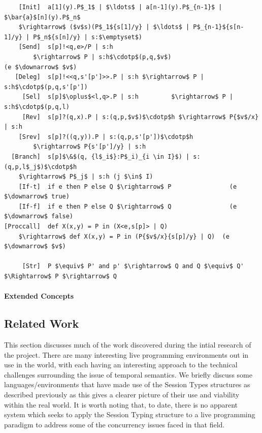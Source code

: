 \documentclass[11pt]{scrartcl}
\begin{document}
\begin{lstlisting}
    [Init]  a[1](y).P$_1$ | $\ldots$ | a[n-1](y).P$_{n-1}$ | $\bar{a}$[n](y).P$_n$ 
	$\rightarrow$ ($v$s)(P$_1${s[1]/y} | $\ldots$ | P$_{n-1}${s[n-1]/y} | P$_n${s[n]/y} | s:$\emptyset$)
    [Send]  s[p]!<q,e>/P | s:h 
        $\rightarrow$ P | s:h$\cdotp$(p,q,$v$)                           (e $\downarrow$ $v$)
   [Deleg]  s[p]!<<q,s'[p']>>.P | s:h $\rightarrow$ P | s:h$\cdotp$(p,q,s'[p'])
     [Sel]  s[p]$\oplus$<l,q>.P | s:h         $\rightarrow$ P | s:h$\cdotp$(p,q,l)
     [Rev]  s[p]?(q,x).P | s:(q,p,$v$)$\cdotp$h $\rightarrow$ P{$v$/x} | s:h
    [Srev]  s[p]?((q,y)).P | s:(q,p,s'[p'])$\cdotp$h 
        $\rightarrow$ P{s'[p']/y} | s:h
  [Branch]  s[p]$\&$(q, {l$_i$}:P$_i)_{i \in I}$) | s:(q,p,l$_j$)$\cdotp$h 
	$\rightarrow$ P$_j$ | s:h (j $\in$ I)
    [If-t]  if e then P else Q $\rightarrow$ P                (e $\downarrow$ true)
    [If-f]  if e then P else Q $\rightarrow$ Q                (e $\downarrow$ false)
[Proccall]  def X(x,y) = P in (X<e,s[p]> | Q) 
	$\rightarrow$ def X(x,y) = P in (P{$v$/x}{s[p]/y} | Q)  (e $\downarrow$ $v$)

     [Str]  P $\equiv$ P' and p' $\rightarrow$ Q and Q $\equiv$ Q' $\Rightarrow$ P $\rightarrow$ Q
\end{lstlisting}

\paragraph{Extended Concepts}
\newpage

\subsection{Related Work}
This section discusses much of the work discovered during the intial research 
of the project. There are many interesting live programming environments out 
in use in the world, with each having an interesting approach to the technical 
challenges surrounding the issue of temporal semantics. We briefly discuss 
some languages/environments that have made use of the Session Types structures 
as described previously as this gives a clearer picture of their use and 
viability within the real world. It is worth noting that, to date, there is no 
apparent system which seeks to apply the Session Typing structure to a live 
programming paradigm to address some of the concurrency issues faced in that 
field.
\end{document}
